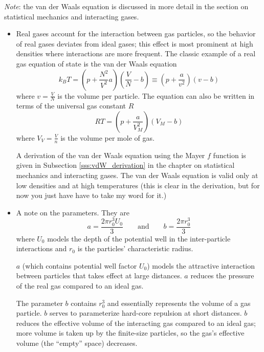 \documentclass[11pt, a4paper]{article}
\begin{document}
\vspace{2mm}
\textit{Note}: the van der Waals equation is discussed in more detail in the section on statistical mechanics and interacting gases.
\begin{itemize}
	\item Real gases account for the interaction between gas particles, so the behavior of real gases deviates from ideal gases; this effect is most prominent at high densities where interactions are more frequent. The classic example of a real gas equation of state is the van der Waals equation
	\begin{equation*}
		k_{B}T = \left(p + \frac{N^{2}}{V^{2}}a\right)\left(\frac{V}{N} - b\right) \equiv \left(p + \frac{a}{v^{2}}\right)\left(v - b\right)
	\end{equation*}
	where $ v = \frac{V}{N} $ is the volume per particle. The equation can also be written in terms of the universal gas constant $ R $ 
	\begin{equation*}
		RT = \left(p + \frac{a}{V_{M}^{2}}\right)\left(V_{M} - b\right)
	\end{equation*}
	where $ V_{V} = \frac{V}{n}$ is the volume per mole of gas. 
	
	A derivation of the van der Waals equation using the Mayer $ f $ function is given in Subsection \ref{sss:vdW_derivation} in the chapter on statistical mechanics and interacting gases. The van der Waals equation is valid only at low densities and at high temperatures (this is clear in the derivation, but for now you just have have to take my word for it.)
	
	\item A note on the parameters. They are
	\begin{equation*}
	 a = \frac{2\pi r_{0}^{3}U_{0}}{3} \qquad \text{and} \qquad b = \frac{2\pi r_{0}^{3}}{3} 
	\end{equation*}
	where $ U_{0} $ models the depth of the potential well in the inter-particle interactions and $ r_{0} $ is the particles' characteristic radius.
	
	$ a $ (which contains potential well factor $ U_{0} $) models the attractive interaction between particles that takes effect at large distances. $ a $ reduces the pressure of the real gas compared to an ideal gas.
		
	The parameter $ b $ contains $ r_{0}^{3} $ and essentially represents the volume of a gas particle. $ b $ serves to parameterize hard-core repulsion at short distances. $ b $ reduces the effective volume of the interacting gas compared to an ideal gas; more volume is taken up by the finite-size particles, so the gas's effective volume (the ``empty'' space) decreases. 
	

\end{itemize}
\end{document}

